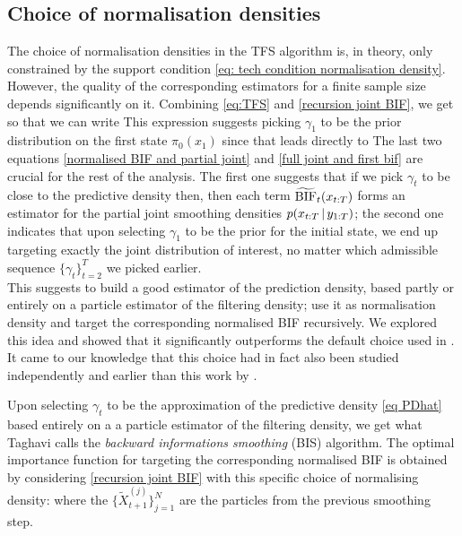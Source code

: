 \subsection{Choice of normalisation densities}
The choice of normalisation densities in the TFS algorithm is, in theory, only constrained by the support condition \eqref{eq: tech condition normalisation density}. However, the quality of the corresponding estimators for a finite sample size depends significantly on it. 
Combining \eqref{eq:TFS} and \eqref{recursion joint BIF}, we get
%
%
so that we can write
%
%
This expression suggests picking $\gamma_{1}$ to be the prior distribution on the first state $\pi_{0}(x_{1})$ since that leads directly to 
%
%
The last two equations \eqref{normalised BIF and partial joint} and \eqref{full joint and first bif} are crucial for the rest of the analysis. The first one suggests that if we pick $\gamma_{t}$ to be close to the predictive density then, then each term $\widetilde{\text{BIF}}_{t}(x_{t:T})$ forms an estimator for the partial joint smoothing densities $p(x_{t:T}\,|\, y_{1:T})$; the second one indicates that upon selecting $\gamma_{1}$ to be the prior for the initial state, we end up targeting exactly the joint distribution of interest, no matter which admissible sequence $\{\gamma_{t}\}_{t=2}^{T}$ we picked earlier. \\
This suggests to build a good estimator of the prediction density, based partly or entirely on a particle estimator of the filtering density; use it as normalisation density and target the corresponding normalised BIF recursively. 
We explored this idea and showed that it significantly outperforms the default choice used in \citep{briers10, fearnhead10}. It came to our knowledge that this choice had in fact also been studied independently and earlier than this work by \citet{taghavi12}. 

Upon selecting $\gamma_{t}$ to be the approximation of the predictive density \eqref{eq PDhat} based entirely on a a particle estimator of the filtering density, we get what Taghavi calls the \emph{backward informations smoothing} (BIS) algorithm. 
The optimal importance function for targeting the corresponding normalised BIF is obtained by considering \eqref{recursion joint BIF} with this specific choice of normalising density:
where the $\{\tilde X_{t+1}^{(j)}\}_{j=1}^{N}$ are the particles from the previous smoothing step. 


